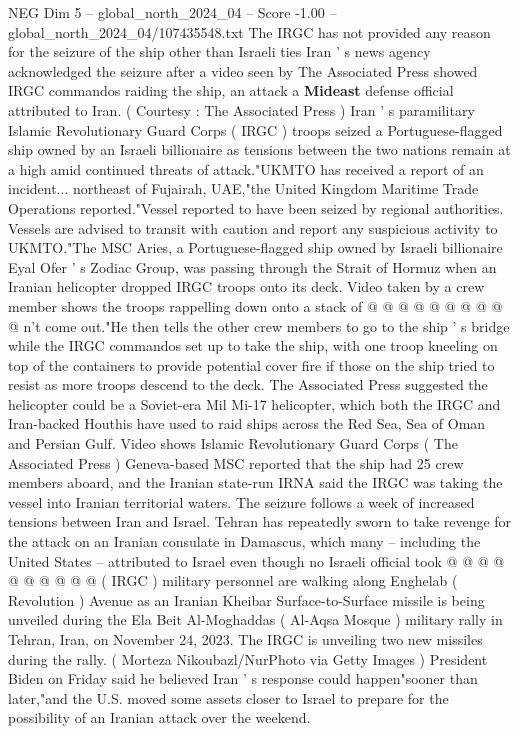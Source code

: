 \begin{textsample}{NEG Dim 5 – global\_north\_2024\_04 – Score -1.00 – global\_north\_2024\_04/107435548.txt}  \label{ex:f5_neg_194}
The IRGC has not provided any reason for the seizure of the ship other than Israeli ties Iran ' s news agency acknowledged the seizure after a video seen by The Associated Press showed IRGC commandos raiding the ship, an attack a \textbf{Mideast} defense official attributed to Iran. ( Courtesy : The Associated Press ) Iran ' s paramilitary Islamic Revolutionary Guard Corps ( IRGC ) troops seized a Portuguese-flagged ship owned by an Israeli billionaire as tensions between the two nations remain at a high amid continued threats of attack."UKMTO has received a report of an incident... northeast of Fujairah, UAE,"the United Kingdom Maritime Trade Operations reported."Vessel reported to have been seized by regional authorities.
Vessels are advised to transit with caution and report any suspicious activity to UKMTO."The MSC Aries, a Portuguese-flagged ship owned by Israeli billionaire Eyal Ofer ' s Zodiac Group, was passing through the Strait of Hormuz when an Iranian helicopter dropped IRGC troops onto its deck.
Video taken by a crew member shows the troops rappelling down onto a stack of @ @ @ @ @ @ @ @ @ @ n't come out."He then tells the other crew members to go to the ship ' s bridge while the IRGC commandos set up to take the ship, with one troop kneeling on top of the containers to provide potential cover fire if those on the ship tried to resist as more troops descend to the deck.
The Associated Press suggested the helicopter could be a Soviet-era Mil Mi-17 helicopter, which both the IRGC and Iran-backed Houthis have used to raid ships across the Red Sea, Sea of Oman and Persian Gulf.
Video shows Islamic Revolutionary Guard Corps ( The Associated Press ) Geneva-based MSC reported that the ship had 25 crew members aboard, and the Iranian state-run IRNA said the IRGC was taking the vessel into Iranian territorial waters.
The seizure follows a week of increased tensions between Iran and Israel.
Tehran has repeatedly sworn to take revenge for the attack on an Iranian consulate in Damascus, which many -- including the United States -- attributed to Israel even though no Israeli official took @ @ @ @ @ @ @ @ @ @ ( IRGC ) military personnel are walking along Enghelab ( Revolution ) Avenue as an Iranian Kheibar Surface-to-Surface missile is being unveiled during the Ela Beit Al-Moghaddas ( Al-Aqsa Mosque ) military rally in Tehran, Iran, on November 24, 2023.
The IRGC is unveiling two new missiles during the rally. ( Morteza Nikoubazl/NurPhoto via Getty Images ) President Biden on Friday said he believed Iran ' s response could happen"sooner than later,"and the U.S. moved some assets closer to Israel to prepare for the possibility of an Iranian attack over the weekend.

\end{textsample}
